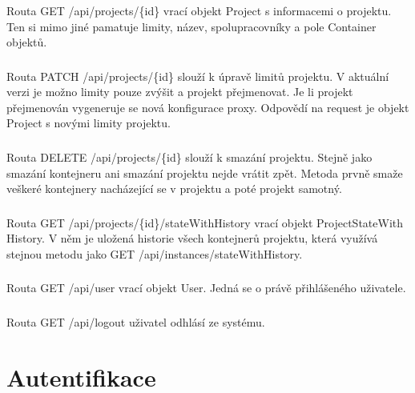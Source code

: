 \documentclass[a4paper,oneside,12pt]{report}
\begin{document}
Routa GET /api/projects/\{id\} vrací objekt Project s informacemi o projektu.
Ten si mimo jiné pamatuje limity, název, spolupracovníky a pole Container objektů.

\subsubsection{}

Routa PATCH /api/projects/\{id\} slouží k úpravě limitů projektu.
V aktuální verzi je možno limity pouze zvýšit a projekt přejmenovat.
Je li projekt přejmenován vygeneruje se nová konfigurace proxy.
Odpovědí na request je objekt Project s novými limity projektu.

\subsubsection{}

Routa DELETE /api/projects/\{id\} slouží k smazání projektu.
Stejně jako  smazání kontejneru ani smazání projektu nejde vrátit zpět.
Metoda prvně smaže veškeré kontejnery nacházející se v projektu a poté projekt samotný.

\subsubsection{}

Routa GET /api/projects/\{id\}/stateWithHistory vrací objekt ProjectStateWith History.
V něm je uložená historie všech kontejnerů projektu, která využívá stejnou metodu jako GET /api/instances/stateWithHistory.

\subsubsection{\color{apiblue}{GET -- /api/user}}

Routa GET /api/user vrací objekt User.
Jedná se o právě přihlášeného uživatele.

\subsubsection{\color{apiblue}{GET -- /api/logout}}

Routa GET /api/logout uživatel odhlásí ze systému.


\section{Autentifikace}
\end{document}
